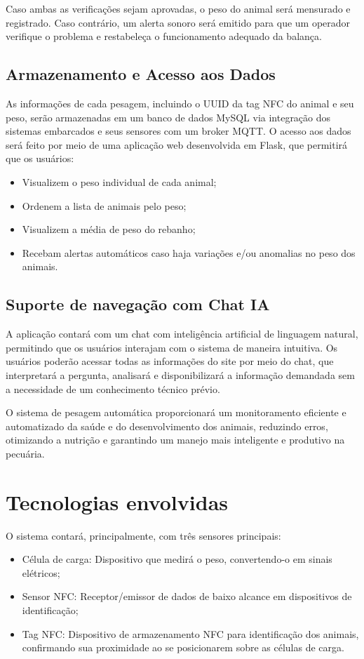 \documentclass[11pt]{article}
\begin{document}
Caso ambas as verificações sejam aprovadas, o peso do animal será mensurado e registrado. Caso contrário, um alerta sonoro será emitido para que um operador verifique o problema e restabeleça o funcionamento adequado da balança.

\subsection{Armazenamento e Acesso aos Dados}
As informações de cada pesagem, incluindo o UUID da tag NFC do animal e seu peso, serão armazenadas em um banco de dados MySQL via integração dos sistemas embarcados e seus sensores com um broker MQTT. O acesso aos dados será feito por meio de uma aplicação web desenvolvida em Flask, que permitirá que os usuários:

\begin{itemize}
    \item Visualizem o peso individual de cada animal;
    \item Ordenem a lista de animais pelo peso;
    \item Visualizem a média de peso do rebanho;
    \item Recebam alertas automáticos caso haja variações e/ou anomalias no peso dos animais.
\end{itemize}

\subsection{Suporte de navegação com Chat IA}
A aplicação contará com um chat com inteligência artificial de linguagem natural, permitindo que os usuários interajam com o sistema de maneira intuitiva. Os usuários poderão acessar todas as informações do site por meio do chat, que interpretará a pergunta, analisará e disponibilizará a informação demandada sem a necessidade de um conhecimento técnico prévio.

O sistema de pesagem automática proporcionará um monitoramento eficiente e automatizado da saúde e do desenvolvimento dos animais, reduzindo erros, otimizando a nutrição e garantindo um manejo mais inteligente e produtivo na pecuária.

\section{Tecnologias envolvidas}
O sistema contará, principalmente, com três sensores principais:
\begin{itemize}
    \item Célula de carga: Dispositivo que medirá o peso, convertendo-o em sinais elétricos;
    \item Sensor NFC: Receptor/emissor de dados de baixo alcance em dispositivos de identificação;
    \item Tag NFC: Dispositivo de armazenamento NFC para identificação dos animais, confirmando sua proximidade ao se posicionarem sobre as células de carga.
\end{itemize}
\end{document}
